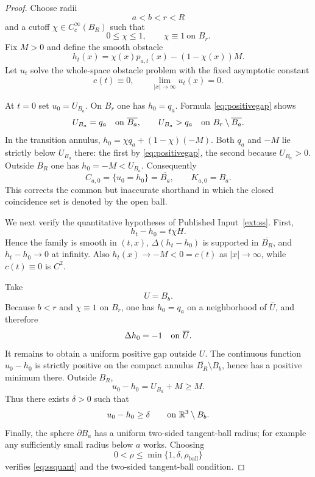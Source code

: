 \documentclass[11pt]{article}
\theoremstyle{definition}
\theoremstyle{remark}
\newcommand{\R}{\mathbb{R}}
\newcommand{\lap}{\Delta}
\newcommand{\1}{\mathbf{1}}
\begin{document}
\begin{proof}
Choose radii
\[
 a<b<r<R
\]
and a cutoff $\chi\in C_c^\infty(B_R)$ such that
\[
 0\le\chi\le1,
 \qquad
 \chi\equiv1\ \text{on }B_r.
\]
Fix $M>0$ and define the smooth obstacle
\begin{equation}\label{eq:obstacle}
 h_t(x)=\chi(x)p_{a,t}(x)-(1-\chi(x))M.
\end{equation}
Let $u_t$ solve the whole-space obstacle problem with the fixed asymptotic constant
\begin{equation}\label{eq:c0}
 c(t)\equiv0,
 \qquad
 \lim_{|x|\to\infty}u_t(x)=0.
\end{equation}

At $t=0$ set $u_0=U_{B_a}$. On $B_r$ one has $h_0=q_a$. Formula \eqref{eq:positivegap} shows
\[
 U_{B_a}=q_a\quad\hbox{on }\overline{B_a},
 \qquad
 U_{B_a}>q_a\quad\hbox{on }B_r\setminus\overline{B_a}.
\]
In the transition annulus, $h_0=\chi q_a+(1-\chi)(-M)$. Both $q_a$ and $-M$ lie strictly below $U_{B_a}$ there: the first by \eqref{eq:positivegap}, the second because $U_{B_a}>0$. Outside $B_R$ one has $h_0=-M<U_{B_a}$. Consequently
\begin{equation}\label{eq:contact0}
 C_{a,0}=\{u_0=h_0\}=\overline{B_a},
 \qquad
 K_{a,0}=B_a.
\end{equation}
This corrects the common but inaccurate shorthand in which the closed coincidence set is denoted by the open ball.

We next verify the quantitative hypotheses of Published Input~\ref{ext:ss}. First,
\begin{equation}\label{eq:perturb}
 h_t-h_0=t\chi H.
\end{equation}
Hence the family is smooth in $(t,x)$, $\lap(h_t-h_0)$ is supported in $\overline{B_R}$, and $h_t-h_0\to0$ at infinity. Also $h_t(x)\to-M<0=c(t)$ as $|x|\to\infty$, while $c(t)\equiv0$ is $C^2$.

Take
\[
 U=B_b.
\]
Because $b<r$ and $\chi\equiv1$ on $B_r$, one has $h_0=q_a$ on a neighborhood of $\overline U$, and therefore
\[
 \lap h_0=-1\quad\hbox{on }\overline U.
\]
It remains to obtain a uniform positive gap outside $U$. The continuous function $u_0-h_0$ is strictly positive on the compact annulus $\overline{B_R}\setminus B_b$, hence has a positive minimum there. Outside $B_R$,
\[
 u_0-h_0=U_{B_a}+M\ge M.
\]
Thus there exists $\delta>0$ such that
\begin{equation}\label{eq:gap}
 u_0-h_0\ge\delta\qquad\hbox{on }\R^3\setminus B_b.
\end{equation}
Finally, the sphere $\partial B_a$ has a uniform two-sided tangent-ball radius; for example any sufficiently small radius below $a$ works. Choosing
\[
 0<\rho\le \min\{1,\delta,\rho_{\mathrm{ball}}\}
\]
verifies \eqref{eq:ssquant} and the two-sided tangent-ball condition.


\end{proof}
\end{document}

